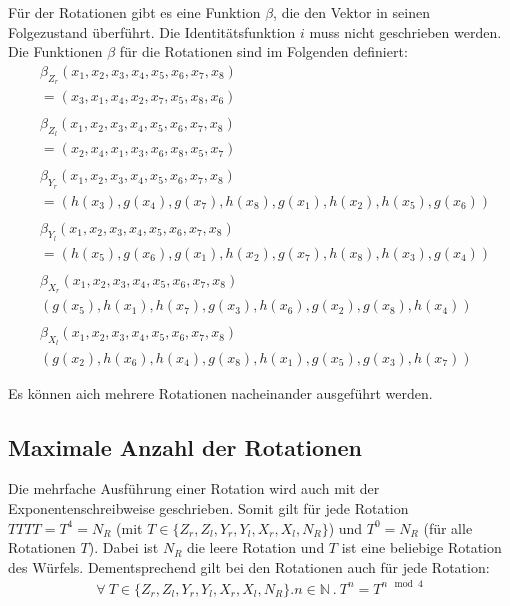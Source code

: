\documentclass[12pt,a4paper, usenames, dvipsnames]{article}
\theoremstyle{mystyle}
\theoremstyle{definition}
\begin{document}
Für der Rotationen gibt es eine Funktion $\beta$, die den Vektor in seinen Folgezustand überführt. Die Identitätsfunktion $i$ muss nicht geschrieben werden. Die Funktionen $\beta$ für die Rotationen sind im Folgenden definiert:
\begin{align*}
 & \beta_{Z_r}(x_1, x_2, x_3, x_4, x_5,x_6,x_7,x_8) \\
 & = (x_3, x_1, x_4, x_2, x_7, x_5, x_8, x_6) \\
\\
 & \beta_{Z_l}(x_1, x_2, x_3, x_4, x_5,x_6,x_7,x_8) \\
 & = (x_2, x_4, x_1, x_3, x_6, x_8, x_5, x_7) \\
\\
 & \beta_{Y_r}(x_1, x_2, x_3, x_4, x_5,x_6,x_7,x_8) \\
 & = (h(x_3), g(x_4), g(x_7), h(x_8), g(x_1), h(x_2), h(x_5), g(x_6)) \\
\\
 & \beta_{Y_l}(x_1, x_2, x_3, x_4, x_5,x_6,x_7,x_8) \\
 & = (h(x_5), g(x_6), g(x_1), h(x_2),g(x_7),h(x_8),h(x_3),g(x_4)) \\
\\
 & \beta_{X_r}(x_1, x_2, x_3, x_4, x_5,x_6,x_7,x_8) \\
 & (g(x_5), h(x_1), h(x_7), g(x_3), h(x_6), g(x_2), g(x_8),h(x_4)) \\
\\
 & \beta_{X_l}(x_1, x_2, x_3, x_4, x_5,x_6,x_7,x_8) \\
 & (g(x_2), h(x_6), h(x_4),g(x_8), h(x_1), g(x_5), g(x_3), h(x_7)) 
\end{align*}

Es können aich mehrere Rotationen nacheinander ausgeführt werden.



%
%
%
%
%
%
%
%
%
%
%
%
%
%
%
%
%
%
%

\subsection{Maximale Anzahl der Rotationen}
\label{Abschnitt_MaxAnzahlRotationen}

Die mehrfache Ausführung einer Rotation wird auch mit der Exponentenschreibweise geschrieben. 
Somit gilt für jede Rotation $TTTT=T^4=N_R$ (mit $T \in \{{Z_r}, {Z_l}, {Y_r}, {Y_l}, {X_r}, {X_l} , N_R \}$) und $T^0=N_R$ (für alle Rotationen $T$). Dabei ist $N_R$ die leere Rotation und $T$ ist eine beliebige Rotation des Würfels. 
Dementsprechend gilt bei den Rotationen auch für jede Rotation: 
\begin{align*}
\forall \ T \in \{{Z_r}, {Z_l}, {Y_r}, {Y_l}, {X_r}, {X_l}, N_R \}. n \in \mathbb{N} \ . \ T^n=T^{n \mod 4}
\end{align*}
\end{document}
